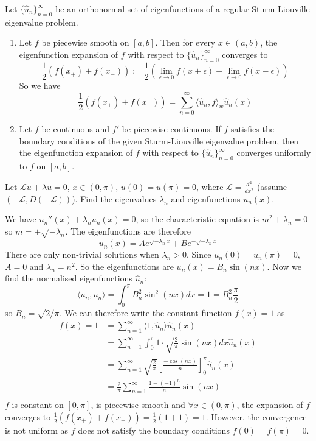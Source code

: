 \begin{proposition}
	Let $\{ \hat{u}_n \}_{n = 0}^{\infty}$ be an orthonormal set of eigenfunctions of a regular Sturm-Liouville eigenvalue problem.
	\begin{enumerate}
		\item Let $f$ be piecewise smooth on $[a, b]$. Then for every $x \in (a, b)$, the eigenfunction expansion of $f$ with respect to $\{ \hat{u}_n \}_{n = 0}^{\infty}$ converges to
		\[
			\frac{1}{2} (f(x_+) + f(x_-)) := \frac{1}{2} \left( \lim_{\epsilon
			 \to 0} f(x + \epsilon) + \lim_{\epsilon \to 0} f(x - \epsilon) \right)
		\]
		So we have
		\[
			\frac{1}{2} (f(x_+) + f(x_-)) = \sum_{n = 0}^{\infty} {\langle \hat{u}_n, f \rangle}_w \hat{u}_n(x)
		\]
		\item Let $f$ be continuous and $f'$ be piecewise continuous. If $f$ satisfies the boundary conditions of the given Sturm-Liouville eigenvalue problem, then the eigenfunction expansion of $f$ with respect to $\{ \hat{u}_n \}_{n = 0}^{\infty}$ converges uniformly to $f$ on $[a, b]$.
	\end{enumerate}
\end{proposition}

\begin{example}
	Let $\mathcal{L} u + \lambda u = 0$, $x \in (0, \pi)$, $u(0) = u(\pi) = 0$, where $\mathcal{L} = \frac{d^2}{dx^2}$ (assume $(-\mathcal{L}, D(-\mathcal{L}))$). Find the eigenvalues $\lambda_n$ and eigenfunctions $u_n(x)$.

	We have $u_n''(x) + \lambda_n u_n(x) = 0$, so the characteristic equation is $m^2 + \lambda_n = 0$ so $m = \pm \sqrt{-\lambda_n}$. The eigenfunctions are therefore
	\[
		u_n(x) = A e^{\sqrt{-\lambda_n} x} + B e^{-\sqrt{-\lambda_n} x}
	\]
	There are only non-trivial solutions when $\lambda_n > 0$. Since $u_n(0) = u_n(\pi) = 0$, $A = 0$ and $\lambda_n = n^2$. So the eigenfunctions are $u_n(x) = B_n \sin(nx)$. Now we find the normalised eigenfunctions $\hat{u}_n$:
	\[
		\langle u_n, u_n \rangle = \int_{0}^{\pi} B_n^2 \sin^2(nx) dx = 1 = B_n^2 \frac{\pi}{2}
	\]
	so $B_n = \sqrt{2 / \pi}$. We can therefore write the constant function $f(x) = 1$ as
	\[
		\begin{aligned}
			f(x) = 1 & = \sum_{n = 1}^{\infty} \langle 1, \hat{u}_n \rangle \hat{u}_n(x) \\
			& = \sum_{n = 1}^{\infty} \int_{0}^{\pi} 1 \cdot \sqrt{\frac{2}{\pi}} \sin(nx) dx \hat{u}_n(x) \\
			& = \sum_{n = 1}^{\infty} \sqrt{\frac{2}{\pi}} \left[ \frac{-\cos(nx)}{n} \right]_0^{\pi} \hat{u}_n(x) \\
			& = \frac{2}{\pi} \sum_{n = 1}^{\infty} \frac{1 - {(-1)}^n}{n} \sin(nx) \\
		\end{aligned}
	\]
	$f$ is constant on $[0, \pi]$, is piecewise smooth and $\forall x \in (0, \pi)$, the expansion of $f$ converges to $\frac{1}{2} (f(x_+) + f(x_-)) = \frac{1}{2} (1 + 1) = 1$. However, the convergence is not uniform as $f$ does not satisfy the boundary conditions $f(0) = f(\pi) = 0$.
\end{example}

